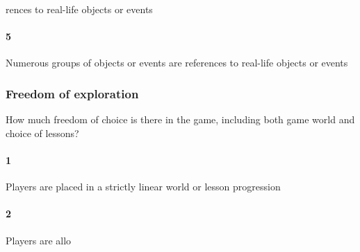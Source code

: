 rences to real-life objects or events\paragraph{5}Numerous groups of objects or events are references to real-life objects or events\subsubsection{Freedom of exploration}How much freedom of choice is there in the game, including both game world and choice of lessons?\paragraph{1}Players are placed in a strictly linear world or lesson progression\paragraph{2}Players are allo
